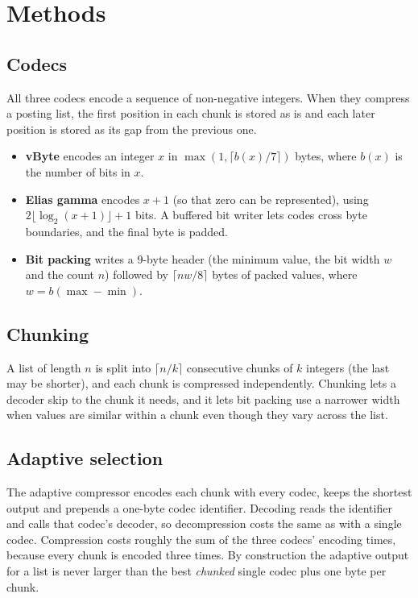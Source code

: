 \documentclass[11pt]{article}
\begin{document}
\section{Methods}

\subsection{Codecs}

All three codecs encode a sequence of non-negative integers. When they compress a posting list,
the first position in each chunk is stored as is and each later position is stored as its gap
from the previous one.
\begin{itemize}
  \item \textbf{vByte} encodes an integer $x$ in $\max(1,\lceil b(x)/7\rceil)$ bytes, where $b(x)$ is
        the number of bits in $x$.
  \item \textbf{Elias gamma} encodes $x+1$ (so that zero can be represented), using
        $2\lfloor\log_2(x+1)\rfloor+1$ bits. A buffered bit writer lets codes cross byte boundaries,
        and the final byte is padded.
  \item \textbf{Bit packing} writes a 9-byte header (the minimum value, the bit width $w$ and the
        count $n$) followed by $\lceil nw/8\rceil$ bytes of packed values, where
        $w = b(\max - \min)$.
\end{itemize}

\subsection{Chunking}

A list of length $n$ is split into $\lceil n/k\rceil$ consecutive chunks of $k$ integers (the last
may be shorter), and each chunk is compressed independently. Chunking lets a decoder skip to the
chunk it needs, and it lets bit packing use a narrower width when values are similar within a chunk
even though they vary across the list.

\subsection{Adaptive selection}

The adaptive compressor encodes each chunk with every codec, keeps the shortest output and prepends
a one-byte codec identifier. Decoding reads the identifier and calls that codec's decoder, so
decompression costs the same as with a single codec. Compression costs roughly the sum of the three
codecs' encoding times, because every chunk is encoded three times. By construction the adaptive
output for a list is never larger than the best \emph{chunked} single codec plus one byte per chunk.
\end{document}
